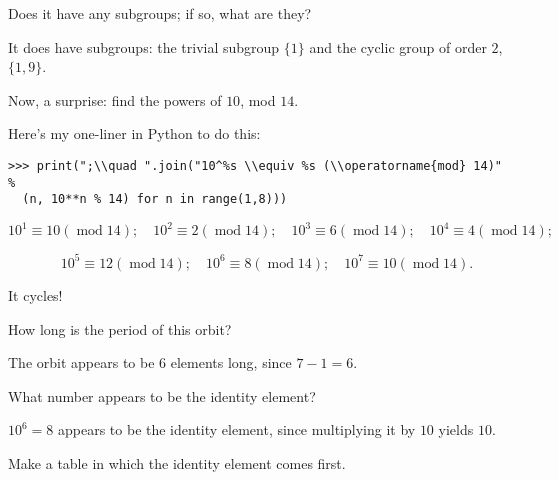 \documentclass[../gatm_answers.tex]{subfiles}
\begin{document}
\begin{inner_problem}
\item Does it have any subgroups; if so, what are they?
\end{inner_problem}

It does have subgroups: the trivial subgroup $\{1\}$ and the cyclic group of order $2$, $\{1,9\}$.

\begin{outer_problem}
\item Now, a surprise: find the powers of $10$, mod $14$.
\end{outer_problem}

Here's my one-liner in Python to do this:
\begin{verbatim}
>>> print(";\\quad ".join("10^%s \\equiv %s (\\operatorname{mod} 14)" %
  (n, 10**n % 14) for n in range(1,8)))
\end{verbatim}

$$10^1 \equiv 10 (\operatorname{mod} 14);\quad 10^2 \equiv 2 (\operatorname{mod} 14);\quad 10^3 \equiv 6 (\operatorname{mod} 14);\quad 10^4 \equiv 4 (\operatorname{mod} 14);$$

$$\quad 10^5\equiv 12 (\operatorname{mod} 14);\quad 10^6 \equiv 8 (\operatorname{mod} 14);\quad 10^7 \equiv 10 (\operatorname{mod} 14).$$

It cycles!

\begin{inner_problem}[start=1]
\item How long is the period of this orbit?
\end{inner_problem}

The orbit appears to be $6$ elements long, since $7-1=6$.

\begin{inner_problem}
\item What number appears to be the identity element?
\end{inner_problem}

$10^6=8$ appears to be the identity element, since multiplying it by $10$ yields $10$.

\begin{inner_problem}
\item Make a table in which the identity element comes first.
\end{inner_problem}
\end{document}
